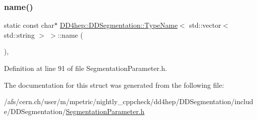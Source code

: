 \subsubsection{\texorpdfstring{name()}{name()}}
{\footnotesize\ttfamily static const char$\ast$ \hyperlink{struct_d_d4hep_1_1_d_d_segmentation_1_1_type_name}{D\+D4hep\+::\+D\+D\+Segmentation\+::\+Type\+Name}$<$ std\+::vector$<$ std\+::string $>$ $>$\+::name (\begin{DoxyParamCaption}{ }\end{DoxyParamCaption})\hspace{0.3cm}{\ttfamily [inline]}, {\ttfamily [static]}}



Definition at line 91 of file Segmentation\+Parameter.\+h.



The documentation for this struct was generated from the following file\+:\begin{DoxyCompactItemize}
\item 
/afs/cern.\+ch/user/m/mpetric/nightly\+\_\+cppcheck/dd4hep/\+D\+D\+Segmentation/include/\+D\+D\+Segmentation/\hyperlink{_segmentation_parameter_8h}{Segmentation\+Parameter.\+h}\end{DoxyCompactItemize}
